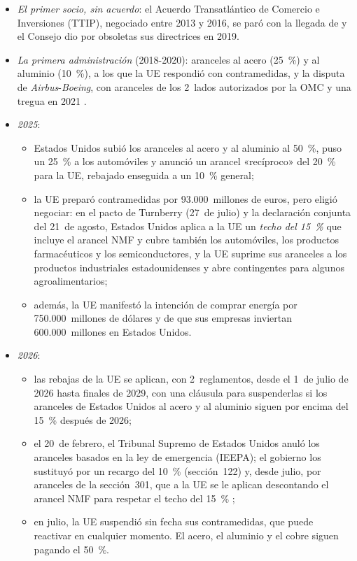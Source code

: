 \documentclass[11pt]{article}
\begin{document}
\begin{itemize}
\item \emph{El primer socio, sin acuerdo}: el Acuerdo Transatlántico de Comercio e Inversiones (TTIP), negociado entre 2013 y 2016, se paró con la llegada de  y el Consejo dio por obsoletas sus directrices en 2019.
\item \emph{La primera administración } (2018-2020): aranceles al acero (25~\%) y al aluminio (10~\%), a los que la UE respondió con contramedidas, y la disputa de \emph{Airbus}-\emph{Boeing}, con aranceles de los 2~lados autorizados por la OMC y una tregua en 2021 .
\item \emph{2025}\nocite{UE2025DeclaracionEEUU,JonesDay2026IEEPA}:
  \begin{itemize}
  \item Estados Unidos subió los aranceles al acero y al aluminio al 50~\%, puso un 25~\% a los automóviles y anunció un arancel «recíproco» del 20~\% para la UE, rebajado enseguida a un 10~\% general;
  \item la UE preparó contramedidas por 93.000~millones de euros, pero eligió negociar: en el pacto de Turnberry (27~de julio) y la declaración conjunta del 21~de agosto, Estados Unidos aplica a la UE un \emph{techo del 15~\%} que incluye el arancel NMF y cubre también los automóviles, los productos farmacéuticos y los semiconductores, y la UE suprime sus aranceles a los productos industriales estadounidenses y abre contingentes para algunos agroalimentarios;
  \item además, la UE manifestó la intención de comprar energía por 750.000~millones de dólares y de que sus empresas inviertan 600.000~millones en Estados Unidos.
  \end{itemize}
\item \emph{2026}:
  \begin{itemize}
  \item las rebajas de la UE se aplican, con 2~reglamentos, desde el 1~de julio de 2026 hasta finales de 2029, con una cláusula para suspenderlas si los aranceles de Estados Unidos al acero y al aluminio siguen por encima del 15~\% después de 2026\nocite{CE2026EEUU};
  \item el 20~de febrero, el Tribunal Supremo de Estados Unidos anuló los aranceles basados en la ley de emergencia (IEEPA); el gobierno los sustituyó por un recargo del 10~\% (sección~122) y, desde julio, por aranceles de la sección~301, que a la UE se le aplican descontando el arancel NMF para respetar el techo del 15~\% ;
  \item en julio, la UE suspendió sin fecha sus contramedidas, que puede reactivar en cualquier momento\nocite{CE2026Contramedidas}. El acero, el aluminio y el cobre siguen pagando el 50~\%.
  \end{itemize}
\end{itemize}
\end{document}
